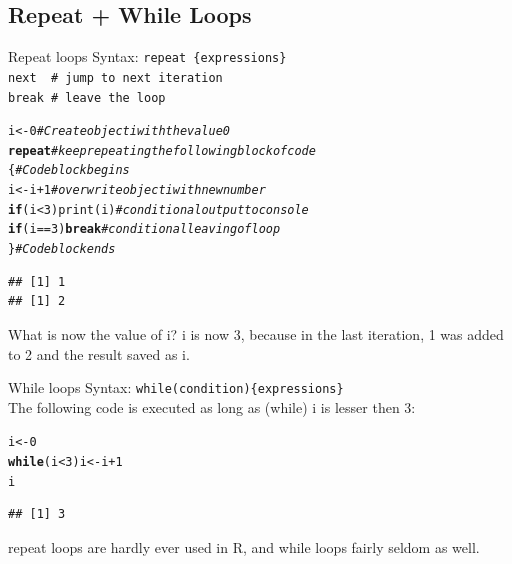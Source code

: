 \documentclass[xcolor=table,       handout,    xcolor=dvipsnames]{beamer}\usepackage[]{graphicx}\usepackage[]{color}
\makeatletter
\newcommand{\hlnum}[1]{\textcolor[rgb]{0,0,0}{#1}}
\newcommand{\hlcom}[1]{\textcolor[rgb]{0,0.392,0}{\textit{#1}}}
\newcommand{\hlopt}[1]{\textcolor[rgb]{0,0,0}{#1}}
\newcommand{\hlstd}[1]{\textcolor[rgb]{0,0,0}{#1}}
\newcommand{\hlkwa}[1]{\textcolor[rgb]{1,0,0}{\textbf{#1}}}
\newcommand{\hlkwb}[1]{\textcolor[rgb]{0,0,0}{#1}}
\newcommand{\hlkwd}[1]{\textcolor[rgb]{0,0,1}{#1}}
\newenvironment{kframe}{%
 \def\at@end@of@kframe{}%
 \ifinner\ifhmode%
  \def\at@end@of@kframe{\end{minipage}}%
  \begin{minipage}{\columnwidth}%
 \fi\fi%
 \def\FrameCommand##1{\hskip\@totalleftmargin \hskip-\fboxsep
 \colorbox{shadecolor}{##1}\hskip-\fboxsep
     \hskip-\linewidth \hskip-\@totalleftmargin \hskip\columnwidth}%
 \MakeFramed {\advance\hsize-\width
   \@totalleftmargin\z@ \linewidth\hsize
   \@setminipage}}%
 {\par\unskip\endMakeFramed%
 \at@end@of@kframe}
\newenvironment{knitrout}{}{} %
\makeatother
\begin{document}
\subsection{Repeat + While Loops}

\begin{frame}[fragile]{Repeat loops}
Syntax:
\texttt{\alert{repeat} \{expressions\}\\
\alert{next} ~\# jump to next iteration\\
\alert{break} \# leave the loop}
\pause
\begin{knitrout}\small
{}\color{fgcolor}\begin{kframe}
\begin{alltt}
\hlstd{i} \hlkwb{<-} \hlnum{0} \hlcom{# Create object i with the value 0}
\hlkwa{repeat} \hlcom{# keep repeating the following block of code}
   \hlstd{\{}                    \hlcom{# Codeblock begins}
   \hlstd{i} \hlkwb{<-} \hlstd{i} \hlopt{+} \hlnum{1}           \hlcom{# overwrite object i with new number}
   \hlkwa{if} \hlstd{(i} \hlopt{<} \hlnum{3}\hlstd{)}  \hlkwd{print}\hlstd{(i)} \hlcom{# conditional output to console}
   \hlkwa{if} \hlstd{(i} \hlopt{==} \hlnum{3}\hlstd{)}   \hlkwa{break}  \hlcom{# conditional leaving of loop}
   \hlstd{\}}                    \hlcom{# Codeblock ends}
\end{alltt}
\begin{verbatim}
## [1] 1
## [1] 2
\end{verbatim}
\end{kframe}
\end{knitrout}
What is now the value of i?
\pause
\small i is now 3, because in the last iteration, 1 was added to 2 and the result saved as i.
\end{frame}


\begin{frame}[fragile]{While loops}
Syntax: \texttt{\alert{while}(condition)\{expressions\}}\\[\baselineskip]
The following code is executed as long as  (while) i is lesser then 3:
\begin{knitrout}
\color{fgcolor}\begin{kframe}
\begin{alltt}
\hlstd{i} \hlkwb{<-} \hlnum{0}
\hlkwa{while}\hlstd{(i} \hlopt{<} \hlnum{3}\hlstd{) i} \hlkwb{<-} \hlstd{i} \hlopt{+} \hlnum{1}
\hlstd{i}
\end{alltt}
\begin{verbatim}
## [1] 3
\end{verbatim}
\end{kframe}
\end{knitrout}
repeat loops are hardly ever used in R, and while loops fairly seldom as well.
\end{frame}
\end{document}
